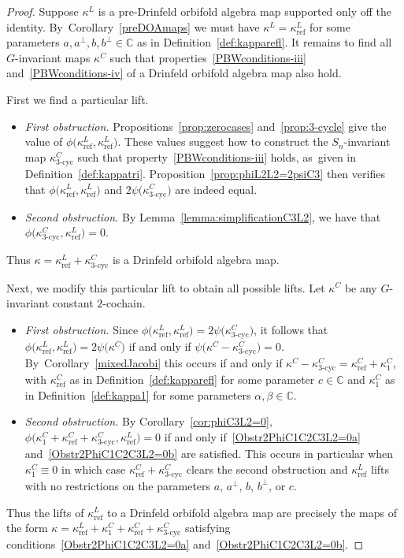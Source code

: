 \documentclass[pdftex]{sigma}
\numberwithin{equation}{section}
\DeclareMathOperator{\refl}{ref}
\DeclareMathOperator{\tri}{3-cyc}
\begin{document}
\begin{proof}
Suppose $\kappa^L$ is a pre-Drinfeld orbifold algebra map supported only off
the identity. By~Corollary~\ref{preDOAmaps} we must have $\kappa^L=\kappa^L_{\refl}$
for some parameters $a,a^\perp,b,b^\perp \in \mathbb{C}$ as in Definition~\ref{def:kapparefl}.
It remains to find all $G$-invariant maps $\kappa^C$ such that
properties~\eqref{PBWconditions-iii} and~\eqref{PBWconditions-iv}
of a Drinfeld orbifold algebra map also hold.

First we find a particular lift.
\begin{itemize}\itemsep=0pt
	\item {\it First obstruction.} Propositions~\ref{prop:zerocases} and~\ref{prop:3-cycle} give the value
	of $\phi\big(\kappa^L_{\refl},\kappa^L_{\refl}\big)$. These values sug\-gest how to construct
	the $S_n$-invariant map $\kappa^C_{\tri}$ such that property~\eqref{PBWconditions-iii}
	holds, as~given in Definition~\ref{def:kappatri}. Proposition~\ref{prop:phiL2L2=2psiC3}
	then verifies that $\phi\big(\kappa^L_{\refl},\kappa^L_{\refl}\big)$ and
	$2\psi\big(\kappa^C_{\tri}\big)$ are indeed equal.
	\item {\it Second obstruction.} By Lemma~\ref{lemma:simplificationC3L2}, we have
	that $\phi\big(\kappa^C_{\tri},\kappa^L_{\refl}\big)=0$.
\end{itemize}
	Thus $\kappa=\kappa^L_{\refl}+\kappa^C_{\tri}$ is 	a Drinfeld orbifold algebra map.

Next, we modify this particular lift to obtain all possible lifts.
Let $\kappa^C$ be any $G$-invariant constant $2$-cochain.
\begin{itemize}\itemsep=0pt
 \item {\it First obstruction. } Since $\phi\big(\kappa^L_{\refl},\kappa^L_{\refl})=2\psi(\kappa^C_{\tri}\big)$,
 it follows that $\phi\big(\kappa^L_{\refl},\kappa^L_{\refl}\big)=2\psi\big(\kappa^C\big)$
 if and only if $\psi\big(\kappa^C-\kappa^C_{\tri}\big)=0$. By~Corollary~\ref{mixedJacobi} this occurs
 if and only if $\kappa^C-\kappa^C_{\tri}=\kappa^C_{\refl}+\kappa^C_1$, with $\kappa^C_{\refl}$
 as in Definition~\ref{def:kapparefl} for some parameter $c\in\mathbb{C}$ and $\kappa^C_1$
 as in Definition~\ref{def:kappa1} for some parameters $\alpha,\beta\in\mathbb{C}$.
 \item {\it Second obstruction. }
 By Corollary~\ref{cor:phiC3L2=0},
 $\phi\big(\kappa^C_1+\kappa^C_{\refl}+\kappa^C_{\tri},\kappa^L_{\refl}\big)=0$
 if and only if~\eqref{Obstr2PhiC1C2C3L2=0a} and~\eqref{Obstr2PhiC1C2C3L2=0b} are satisfied.
 This occurs in particular when $\kappa^C_1 \equiv 0$ in which case
 $\kappa^C_{\refl}+\kappa^C_{\tri}$ clears the second obstruction and
 $\kappa^L_{\refl}$ lifts with no restrictions on the parameters $a$,
 $a^\perp$, $b$, $b^\perp$, or $c$.
 \end{itemize}
 Thus the lifts of $\kappa^L_{\refl}$ to a Drinfeld orbifold algebra map are
 precisely the maps of the form
 $\kappa=\kappa^L_{\refl}+\kappa^C_1+\kappa^C_{\refl}+\kappa^C_{\tri}$ satisfying
 conditions~\eqref{Obstr2PhiC1C2C3L2=0a} and~\eqref{Obstr2PhiC1C2C3L2=0b}.
\end{proof}
\end{document}
